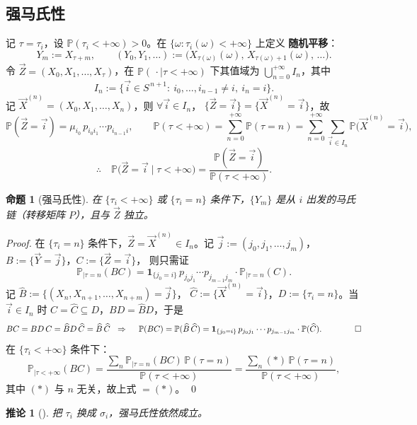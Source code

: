 \documentclass[lang=cn,10pt,newtx,thmcnt=chapter,mode=simple]{vividbook}
\providecommand{\Pp}{}\renewcommand{\Pp}{\mathbb{P}}
\newcommand{\ind}[1]{\mathbf{1}_{\{#1\}}}
\newcommand{\darr}{\;\Rightarrow\;}
\theoremstyle{vividthm}
\newtheorem*{vividproposition}{命题}
\newtheorem*{vividcorollary}{推论}
\theoremstyle{vividdef}
\theoremstyle{vividexa}
\theoremstyle{vividrem}
\renewenvironment{proposition}[1][]{\begin{vividproposition}[#1]}{\end{vividproposition}}
\renewenvironment{corollary}[1][]{\begin{vividcorollary}[#1]}{\end{vividcorollary}}
\begin{document}
\subsection{强马氏性}

记 $\tau=\tau_i$，设 $\Pp(\tau_i<+\infty)>0$。在 $\{\omega:\tau_i(\omega)<+\infty\}$ 上定义
\textbf{随机平移}：
\[
Y_m:=X_{\tau+m},
\qquad
(Y_0,Y_1,\dots):=\bigl(X_{\tau(\omega)}(\omega),\,X_{\tau(\omega)+1}(\omega),\,\dots\bigr).
\]
令 $\vec{Z}=(X_0,X_1,\dots,X_\tau)$，在 $\Pp(\,\cdot\mid\tau<+\infty)$ 下其值域为
$\bigcup_{n=0}^{+\infty}I_n$，其中
\[
I_n:=\bigl\{\vec{i}\in S^{\,n+1}:\ i_0,\dots,i_{n-1}\ne i,\ i_n=i\bigr\}.
\]
记 $\vec{X}^{(n)}=(X_0,X_1,\dots,X_n)$，则 $\forall\vec{i}\in I_n$，
$\{\vec{Z}=\vec{i}\}=\{\vec{X}^{(n)}=\vec{i}\}$，故
\[
\Pp(\vec{Z}=\vec{i})=\mu_{i_0}\,p_{i_0i_1}\cdots p_{i_{n-1}i},
\qquad
\Pp(\tau<+\infty)=\sum_{n=0}^{+\infty}\Pp(\tau=n)
=\sum_{n=0}^{+\infty}\sum_{\vec{i}\in I_n}\Pp\bigl(\vec{X}^{(n)}=\vec{i}\bigr),
\]
\[
\therefore\quad
\Pp\bigl(\vec{Z}=\vec{i}\mid\tau<+\infty\bigr)=\frac{\Pp(\vec{Z}=\vec{i})}{\Pp(\tau<+\infty)}.
\]

\begin{proposition}[强马氏性]
在 $\{\tau_i<+\infty\}$ 或 $\{\tau_i=n\}$ 条件下，$\{Y_m\}$ 是从 $i$ 出发的马氏链（转移矩阵
$P$），且与 $\vec{Z}$ 独立。
\end{proposition}

\begin{proof}
在 $\{\tau_i=n\}$ 条件下，$\vec{Z}=\vec{X}^{(n)}\in I_n$。记
$\vec{j}:=(j_0,j_1,\dots,j_m)$，$B:=\{\vec{Y}=\vec{j}\}$，$C:=\{\vec{Z}=\vec{i}\}$，
则只需证
\[
\Pp_{\mid\tau=n}(BC)=\ind{j_0=i}\,p_{j_0j_1}\cdots p_{j_{m-1}j_m}\cdot
\Pp_{\mid\tau=n}(C).
\]
记 $\widehat{B}:=\{(X_n,X_{n+1},\dots,X_{n+m})=\vec{j}\}$，
$\widehat{C}:=\{\vec{X}^{(n)}=\vec{i}\}$，$D:=\{\tau_i=n\}$。当 $\vec{i}\in I_n$ 时
$C=\widehat{C}\subseteq D$，$BD=\widehat{B}D$，于是
\[
BC=BD\,C=\widehat{B}D\,\widehat{C}=\widehat{B}\,\widehat{C}
\ \darr\quad
\Pp(BC)=\Pp(\widehat{B}\,\widehat{C})
=\ind{j_0=i}\,p_{j_0j_1}\cdots p_{j_{m-1}j_m}\cdot\Pp(\widehat{C}). \qquad\qed
\]
在 $\{\tau_i<+\infty\}$ 条件下：
\[
\Pp_{\mid\tau<+\infty}(BC)
=\frac{\sum_n\Pp_{\mid\tau=n}(BC)\,\Pp(\tau=n)}{\Pp(\tau<+\infty)}
=\frac{\sum_n(\ast)\,\Pp(\tau=n)}{\Pp(\tau<+\infty)} ,
\]
其中 $(\ast)$ 与 $n$ 无关，故上式 $=(\ast)$。 \qed
\end{proof}

\begin{corollary}
把 $\tau_i$ 换成 $\sigma_i$，强马氏性依然成立。
\end{corollary}
\end{document}
